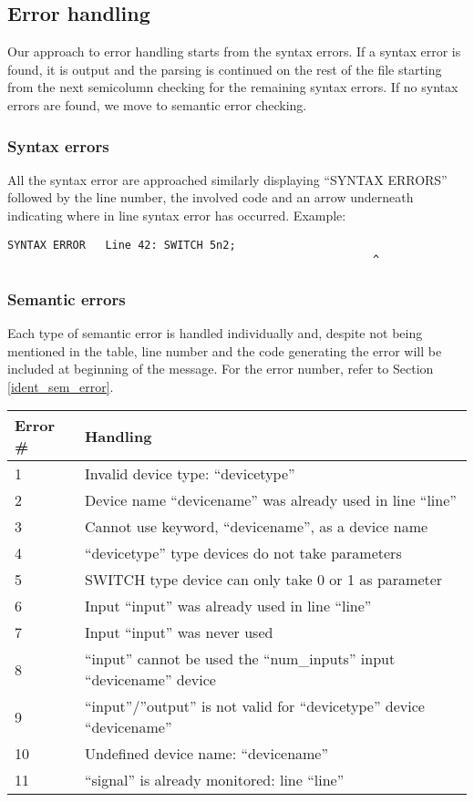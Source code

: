 \documentclass[a4paper,11pt]{article}
\numberwithin{equation}{section}
\begin{document}
\subsection{Error handling}
Our approach to error handling starts from the syntax errors. If a syntax error is found, it is output and the parsing is continued on the rest of the file starting from the next semicolumn checking for the remaining syntax errors. If no syntax errors are found, we move to semantic error checking.
\subsubsection{Syntax errors}
All the syntax error are approached similarly displaying “SYNTAX ERRORS” followed by the line number, the involved code and an arrow underneath indicating where in line syntax error has occurred. Example:

\begin{verbatim}
SYNTAX ERROR   Line 42: SWITCH 5n2;
                    				  			        ^
\end{verbatim}
\subsubsection{Semantic errors}
Each type of semantic error is handled individually and, despite not being mentioned in the table, line number and the code generating the error will be included at beginning of the message. For the error number, refer to Section \ref{ident_sem_error}.

\begin{center}
	\begin{tabular}{l l}
		\hline
		\textbf{Error \#} & \textbf{Handling} \\ 
		\hline
		1 & Invalid device type: “devicetype” \\ 
		2 & Device name “devicename” was already used in line “line”  \\ 
		3 & Cannot use keyword, “devicename”, as a device name \\ 
		4 & “devicetype” type devices do not take parameters   \\ 
		5& SWITCH type device can only take 0 or 1 as parameter \\
		6 & Input “input” was already used in line “line”  \\
		7 & Input {“input”} was never used   \\
		8 & “input” cannot be used the “num\_inputs” input “devicename” device  \\
		9 & “input”/”output” is not valid for “devicetype” device “devicename”   \\ 
		10 & Undefined device name:  “devicename”  \\ 
		11 & “signal” is already monitored: line “line” \\
	\end{tabular}
	\label{bandwidth-efficiency}
\end{center}
\end{document}

